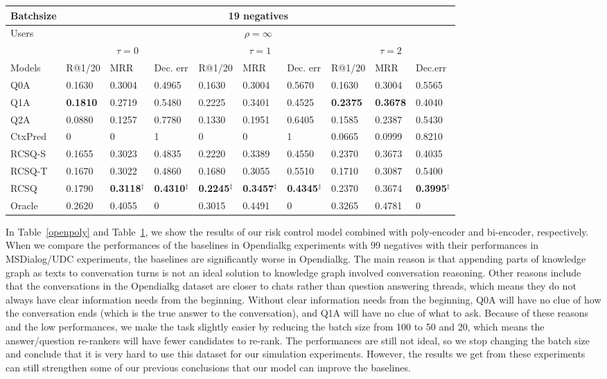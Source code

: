 \documentclass[format=acmsmall, review=False, screen=true]{acmart}
\begin{document}
\begin{table}
{\begin{tabular}{l|l|l|l|l|l|l|l|l|l}
Batchsize & \multicolumn{9}{c}{19 negatives} \\
\hline
\multirow{2}{*}{Users}  & \multicolumn{9}{c}{$\rho=\infty$} \\ 
\cline{2-10}  
  &  \multicolumn{3}{c|}{$\tau=0$} & \multicolumn{3}{c|}{$\tau=1$} & \multicolumn{3}{c}{$\tau=2$}\\ \hline
Models  & R@1/20     & MRR    & Dec. err    & R@1/20     & MRR    & Dec. err & R@1/20 & MRR & Dec.err \\ \hline
Q0A     & 0.1630 & 0.3004 & 0.4965& 0.1630 & 0.3004 & 0.5670 & 0.1630 & 0.3004 & 0.5565\\ 
Q1A     & \textbf{0.1810} & 0.2719 & 0.5480& 0.2225 & 0.3401 & 0.4525& \textbf{0.2375} & \textbf{0.3678} & 0.4040 \\ 
Q2A     & 0.0880 & 0.1257 & 0.7780& 0.1330 & 0.1951 & 0.6405 & 0.1585 &  0.2387 & 0.5430\\
CtxPred & 0 & 0 & 1 & 0 & 0 & 1 & 0.0665 & 0.0999 & 0.8210\\ \hline
RCSQ-S  & 0.1655 & 0.3023 & 0.4835& 0.2220 & 0.3389 & 0.4550&  0.2370 & 0.3673 & 0.4035\\ 
RCSQ-T  & 0.1670 & 0.3022 & 0.4860& 0.1680&  0.3055 & 0.5510 & 0.1710 & 0.3087 & 0.5400\\ 
RCSQ & 0.1790 & \textbf{0.3118}$^{\ddag}$ & \textbf{0.4310}$^{\ddag}$ & \textbf{0.2245}$^{\ddag}$ & \textbf{0.3457}$^{\ddag}$ & \textbf{0.4345}$^{\ddag}$ & 0.2370 & 0.3674 & \textbf{0.3995}$^{\ddag}$ \\ \hline
Oracle  & 0.2620 & 0.4055 & 0& 0.3015 & 0.4491 & 0 & 0.3265 & 0.4781 & 0 \\ 
\hline\hline
\end{tabular}
}
\label{openbi}
\end{table}


In Table~\ref{openpoly} and Table~\ref{openbi}, we show the results of our risk control model combined with poly-encoder and bi-encoder, respectively. When we compare the performances of the baselines in Opendialkg experiments with 99 negatives with their performances in MSDialog/UDC experiments, the baselines are significantly worse in Opendialkg. The main reason is that appending parts of knowledge graph as texts to conversation turns is not an ideal solution to knowledge graph involved conversation reasoning. Other reasons include that the conversations in the Opendialkg dataset are closer to chats rather than question answering threads, which means they do not always have clear information needs from the beginning. Without clear information needs from the beginning, Q0A will have no clue of how the conversation ends (which is the true answer to the conversation), and Q1A will have no clue of what to ask. Because of these reasons and the low performances, we make the task slightly easier by reducing the batch size from 100 to 50 and 20, which means the answer/question re-rankers will have fewer candidates to re-rank. The performances are still not ideal, so we stop changing the batch size and conclude that it is very hard to use this dataset for our simulation experiments. However, the results we get from these experiments can still strengthen some of our previous conclusions that our model can improve the baselines.
\end{document}
